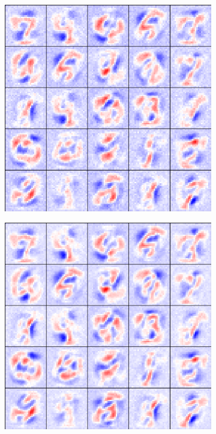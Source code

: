 \documentclass[a4paper]{article}
\begin{document}
\begin{figure}[ht]
  \begin{subfigure}[b]{0.3\textwidth}
   \centering
   \includegraphics[width=\linewidth]{figures/rf350.iter010000.png}
  \end{subfigure}
  \begin{subfigure}[b]{0.3\textwidth}
   \centering
   \includegraphics[width=\linewidth]{figures/rf350.iter020000.png}

\end{subfigure}
\end{figure}
\end{document}
